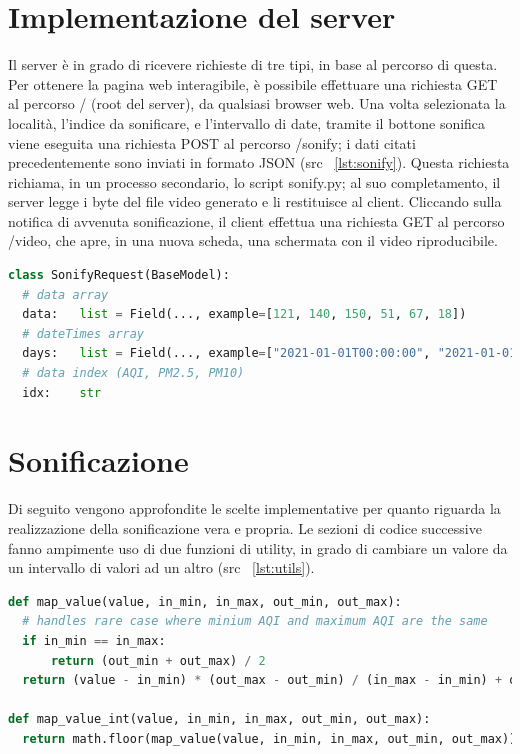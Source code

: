 \section{Implementazione del server}
Il server è in grado di ricevere richieste di tre tipi, in base al percorso di questa.
Per ottenere la pagina web interagibile, è possibile effettuare una richiesta GET al percorso / (root del server), da qualsiasi browser web.
Una volta selezionata la località, l'indice da sonificare, e l'intervallo di date, tramite il bottone sonifica viene eseguita una richiesta POST al percorso /sonify; i dati citati precedentemente sono inviati in formato JSON (src ~\ref{lst:sonify}).
Questa richiesta richiama, in un processo secondario, lo script sonify.py; al suo completamento, il server legge i byte del file video generato e li restituisce al client.
Cliccando sulla notifica di avvenuta sonificazione, il client effettua una richiesta GET al percorso /video, che apre, in una nuova scheda, una schermata con il video riproducibile.
\label{lst:sonify}
\begin{lstlisting}[language=Python]
class SonifyRequest(BaseModel):
  # data array
  data:   list = Field(..., example=[121, 140, 150, 51, 67, 18])
  # dateTimes array
  days:   list = Field(..., example=["2021-01-01T00:00:00", "2021-01-01T00:00:01"])
  # data index (AQI, PM2.5, PM10)
  idx:    str 
\end{lstlisting}



\section{Sonificazione}
Di seguito vengono approfondite le scelte implementative per quanto riguarda la realizzazione della sonificazione vera e propria.
Le sezioni di codice successive fanno ampimente uso di due funzioni di utility, in grado di cambiare un valore da un intervallo di valori ad un altro (src ~\ref{lst:utils}).
\label{lst:utils}
\begin{lstlisting}[language=Python]
def map_value(value, in_min, in_max, out_min, out_max):
  # handles rare case where minium AQI and maximum AQI are the same
  if in_min == in_max:
      return (out_min + out_max) / 2
  return (value - in_min) * (out_max - out_min) / (in_max - in_min) + out_min

def map_value_int(value, in_min, in_max, out_min, out_max):
  return math.floor(map_value(value, in_min, in_max, out_min, out_max))
\end{lstlisting}



